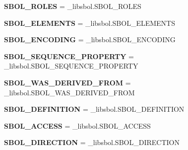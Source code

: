 \begin{DoxyCompactItemize}
\item 
{\bfseries S\+B\+O\+L\+\_\+\+R\+O\+L\+ES} = \+\_\+libsbol.\+S\+B\+O\+L\+\_\+\+R\+O\+L\+ES\hypertarget{namespacesbol_1_1libsbol_a2b46b6d12e6856c2ce6ba15d8aa53aec}{}\label{namespacesbol_1_1libsbol_a2b46b6d12e6856c2ce6ba15d8aa53aec}

\item 
{\bfseries S\+B\+O\+L\+\_\+\+E\+L\+E\+M\+E\+N\+TS} = \+\_\+libsbol.\+S\+B\+O\+L\+\_\+\+E\+L\+E\+M\+E\+N\+TS\hypertarget{namespacesbol_1_1libsbol_a43b9ba5639eed1b242154ea1e84faf53}{}\label{namespacesbol_1_1libsbol_a43b9ba5639eed1b242154ea1e84faf53}

\item 
{\bfseries S\+B\+O\+L\+\_\+\+E\+N\+C\+O\+D\+I\+NG} = \+\_\+libsbol.\+S\+B\+O\+L\+\_\+\+E\+N\+C\+O\+D\+I\+NG\hypertarget{namespacesbol_1_1libsbol_a6403245958e2c2c51cc73a8984cbe63b}{}\label{namespacesbol_1_1libsbol_a6403245958e2c2c51cc73a8984cbe63b}

\item 
{\bfseries S\+B\+O\+L\+\_\+\+S\+E\+Q\+U\+E\+N\+C\+E\+\_\+\+P\+R\+O\+P\+E\+R\+TY} = \+\_\+libsbol.\+S\+B\+O\+L\+\_\+\+S\+E\+Q\+U\+E\+N\+C\+E\+\_\+\+P\+R\+O\+P\+E\+R\+TY\hypertarget{namespacesbol_1_1libsbol_ade0e0b2752303605a447e2358460c611}{}\label{namespacesbol_1_1libsbol_ade0e0b2752303605a447e2358460c611}

\item 
{\bfseries S\+B\+O\+L\+\_\+\+W\+A\+S\+\_\+\+D\+E\+R\+I\+V\+E\+D\+\_\+\+F\+R\+OM} = \+\_\+libsbol.\+S\+B\+O\+L\+\_\+\+W\+A\+S\+\_\+\+D\+E\+R\+I\+V\+E\+D\+\_\+\+F\+R\+OM\hypertarget{namespacesbol_1_1libsbol_a96cb050af081ff4b3ef6516251cf0683}{}\label{namespacesbol_1_1libsbol_a96cb050af081ff4b3ef6516251cf0683}

\item 
{\bfseries S\+B\+O\+L\+\_\+\+D\+E\+F\+I\+N\+I\+T\+I\+ON} = \+\_\+libsbol.\+S\+B\+O\+L\+\_\+\+D\+E\+F\+I\+N\+I\+T\+I\+ON\hypertarget{namespacesbol_1_1libsbol_a45c40efeffd7af5970761f23c6401043}{}\label{namespacesbol_1_1libsbol_a45c40efeffd7af5970761f23c6401043}

\item 
{\bfseries S\+B\+O\+L\+\_\+\+A\+C\+C\+E\+SS} = \+\_\+libsbol.\+S\+B\+O\+L\+\_\+\+A\+C\+C\+E\+SS\hypertarget{namespacesbol_1_1libsbol_ad660bfab8edbe41547944e8ad0b792fd}{}\label{namespacesbol_1_1libsbol_ad660bfab8edbe41547944e8ad0b792fd}

\item 
{\bfseries S\+B\+O\+L\+\_\+\+D\+I\+R\+E\+C\+T\+I\+ON} = \+\_\+libsbol.\+S\+B\+O\+L\+\_\+\+D\+I\+R\+E\+C\+T\+I\+ON\hypertarget{namespacesbol_1_1libsbol_aef96835edec1da5cb7a1e21a6bcfb116}{}\label{namespacesbol_1_1libsbol_aef96835edec1da5cb7a1e21a6bcfb116}


\end{DoxyCompactItemize}
